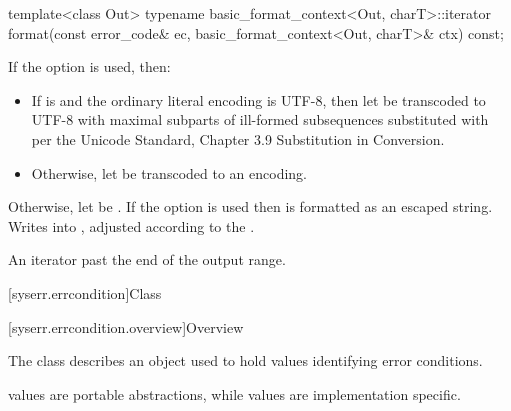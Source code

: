 %
\begin{itemdecl}
template<class Out>
  typename basic_format_context<Out, charT>::iterator
    format(const error_code& ec, basic_format_context<Out, charT>& ctx) const;
\end{itemdecl}

\begin{itemdescr}
\pnum
\effects
If the  option is used, then:
\begin{itemize}
\item
If  is  and the ordinary literal encoding is UTF-8,
then let  be  transcoded to UTF-8
with maximal subparts of ill-formed subsequences
substituted with 
per the Unicode Standard, Chapter 3.9  Substitution in Conversion.
\item
Otherwise, let  be 
transcoded to an
encoding.
\end{itemize}
Otherwise, let  be
.
If the  option is used then  is formatted
as an escaped string.
Writes  into ,
adjusted according to the .

\pnum
\returns
An iterator past the end of the output range.
\end{itemdescr}


[syserr.errcondition]{Class }

[syserr.errcondition.overview]{Overview}

\pnum
The class  describes an object used to hold values identifying
error conditions.
\begin{note}
 values are portable abstractions,
while  values are implementation specific.
\end{note}

